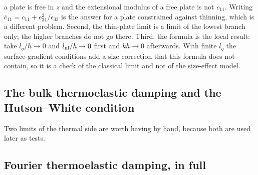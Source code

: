 \documentclass[11pt]{article}
\makeatletter
\newif\ifshowworked
\newenvironment{worked}{%
  \ifshowworked\par\smallskip\noindent\textit{Working.}\par\smallskip\else
  \setbox\z@\vbox\bgroup\fi}{\ifshowworked\par\smallskip\else\egroup\fi}
\makeatother
\begin{document}
\begin{worked}
a plate is free in $z$ and the extensional modulus of a free plate is not $c_{11}$. Writing
$\bar c_{11}=c_{11}+e_{31}^2/\epsilon_{33}$ is the answer for a plate constrained against thinning, which
is a different problem. Second, the thin-plate limit is a limit of the lowest branch only; the higher
branches do not go there. Third, the formula is the local result: take $l_g/h\to0$ and $l_{\rm nl}/h\to0$ first and
$kh\to0$ afterwards. With finite $l_g$ the surface-gradient conditions add a size correction that this formula does
not contain, so it is a check of the classical limit and not of the size-effect model.
\end{worked}

\subsection*{The bulk thermoelastic damping and the Hutson--White condition}

Two limits of the thermal side are worth having by hand, because both are used later as tests.

\subsection*{Fourier thermoelastic damping, in full}
\end{document}
